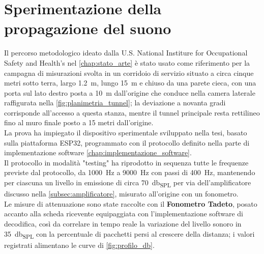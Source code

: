 \chapter{Sperimentazione della propagazione del suono}
\label{chap:sperimentazione_propagazione}

Il percorso metodologico ideato dalla U.S. National Institure for Occupational Safety and Health's\citep[sec.~2]{jacksha2016} nel \autoref{chap:stato_arte} 
è stato usato come riferimento per la campagna 
di misurazioni svolta in un corridoio di servizio situato a circa cinque metri sotto terra, largo 
\SI{1.2}{\meter}, lungo \SI{15}{\meter} e chiuso da una parete cieca, con una porta sul lato destro posta a \SI{10}{\meter} 
dall'origine che conduce nella camera laterale raffigurata nella \autoref{fig:planimetria_tunnel}; la deviazione a novanta gradi
 corrisponde all'accesso a questa stanza, mentre il tunnel principale resta rettilineo fino al muro finale posto a 15 metri dall'origine.\\ 
 La prova ha impiegato il dispositivo sperimentale sviluppato nella tesi, basato sulla piattaforma ESP32, 
 programmato con il protocollo definito nella parte di implementazione software \autoref{chap:implementazione_software}.\\
  Il protocollo in modalità "testing" ha riprodotto in sequenza tutte le frequenze previste dal protocollo, da \SI{1000}{\hertz} a \SI{9000}{\hertz}
   con passi di \SI{400}{\hertz}, mantenendo per ciascuna un livello in emissione di circa \SI{70}{\decibel_{SPL}} per via dell'amplificatore discusso nella
    \autoref{subsec:amplificatore}, 
    misurato all'origine con un fonometro.\\
    Le misure di attenuazione sono state raccolte con il \textbf{Fonometro Tadeto}, posato accanto alla scheda
     ricevente equipaggiata con l'implementazione software di decodifica, così da correlare in tempo reale la variazione del livello sonoro in \SI{35}{\decibel_{SPL}} con
      la percentuale di pacchetti persi al crescere della distanza; i valori registrati alimentano le curve di \autoref{fig:profilo_db}.\\

